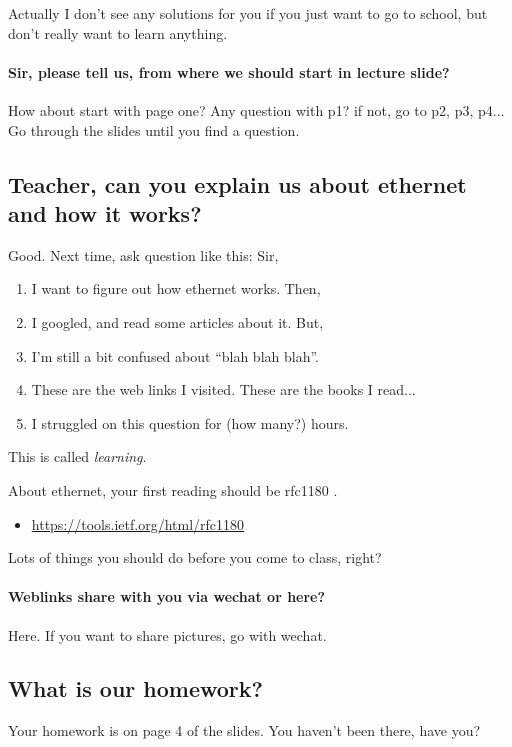 \documentclass{article}
\begin{document}
Actually I don't see any solutions for you if you just want to go to school, but don't
really want to learn anything.
  
\paragraph{Sir, please tell us, from where we should start in lecture slide?}

How about start with page one? Any question with p1? if not, go to p2, p3, p4... Go
through the slides until you find a question.

\subsection[How to ask?]{Teacher, can you explain us about ethernet and how it works?}

Good. Next time, ask question like this: Sir,
\begin{enumerate}
\item I want to figure out how ethernet works. Then,
\item I googled, and read some articles about it. But,
\item I'm still a bit confused about ``blah blah blah''.
\item These are the web links I visited. These are the books I read...
\item I struggled on this question for (how many?) hours.
\end{enumerate}
This is called \emph{learning}.

About ethernet, your first reading should be rfc1180 .
\begin{itemize}
\item \url{https://tools.ietf.org/html/rfc1180}
\end{itemize}
Lots of things you should do before you come to class, right?

\paragraph{Weblinks share with you via wechat or here?}

Here. If you want to share pictures, go with wechat.

\subsection[Homework?]{What is our homework?}

Your homework is on page 4 of the slides. You haven't been there, have you?
\end{document}
